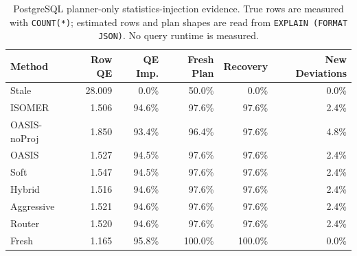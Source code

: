 \begin{table}[t]
  \centering
  \small
  \caption{PostgreSQL planner-only statistics-injection evidence. True rows are measured with \texttt{COUNT(*)}; estimated rows and plan shapes are read from \texttt{EXPLAIN (FORMAT JSON)}. No query runtime is measured.}
  \label{tab:postgres_planner_stats_injection}
  \setlength{\tabcolsep}{4pt}
  \begin{tabular}{lrrrrr}
    \toprule
    Method & Row QE & QE Imp. & Fresh Plan & Recovery & New Deviations \\
    \midrule
    Stale & 28.009 & 0.0\% & 50.0\% & 0.0\% & 0.0\% \\
    ISOMER & 1.506 & 94.6\% & 97.6\% & 97.6\% & 2.4\% \\
    OASIS-noProj & 1.850 & 93.4\% & 96.4\% & 97.6\% & 4.8\% \\
    OASIS & 1.527 & 94.5\% & 97.6\% & 97.6\% & 2.4\% \\
    Soft & 1.547 & 94.5\% & 97.6\% & 97.6\% & 2.4\% \\
    Hybrid & 1.516 & 94.6\% & 97.6\% & 97.6\% & 2.4\% \\
    Aggressive & 1.521 & 94.6\% & 97.6\% & 97.6\% & 2.4\% \\
    Router & 1.520 & 94.6\% & 97.6\% & 97.6\% & 2.4\% \\
    Fresh & 1.165 & 95.8\% & 100.0\% & 100.0\% & 0.0\% \\
    \bottomrule
  \end{tabular}
\end{table}
